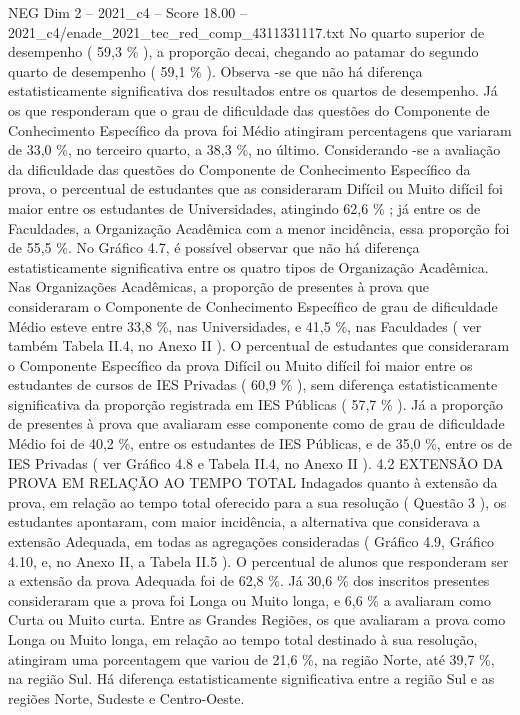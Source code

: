 \begin{textsample}{NEG Dim 2 – 2021\_c4 – Score 18.00 – 2021\_c4/enade\_2021\_tec\_red\_comp\_4311331117.txt}
No quarto superior de desempenho ( 59,3 \% ), a proporção decai, chegando ao patamar do segundo quarto de desempenho ( 59,1 \% ).
Observa -se que não há diferença estatisticamente significativa dos resultados entre os quartos de desempenho.
Já os que responderam que o grau de dificuldade das questões do Componente de Conhecimento Específico da prova foi Médio atingiram percentagens que variaram de 33,0 \%, no terceiro quarto, a 38,3 \%, no último.
Considerando -se a avaliação da dificuldade das questões do Componente de Conhecimento Específico da prova, o percentual de estudantes que as consideraram Difícil ou Muito difícil foi maior entre os estudantes de Universidades, atingindo 62,6 \% ; já entre os de Faculdades, a Organização Acadêmica com a menor incidência, essa proporção foi de 55,5 \%.
No Gráfico 4.7, é possível observar que não há diferença estatisticamente significativa entre os quatro tipos de Organização Acadêmica.
Nas Organizações Acadêmicas, a proporção de presentes à prova que consideraram o Componente de Conhecimento Específico de grau de dificuldade Médio esteve entre 33,8 \%, nas Universidades, e 41,5 \%, nas Faculdades ( ver também Tabela II.4, no Anexo II ).
O percentual de estudantes que consideraram o Componente Específico da prova Difícil ou Muito difícil foi maior entre os estudantes de cursos de IES Privadas ( 60,9 \% ), sem diferença estatisticamente significativa da proporção registrada em IES Públicas ( 57,7 \% ).
Já a proporção de presentes à prova que avaliaram esse componente como de grau de dificuldade Médio foi de 40,2 \%, entre os estudantes de IES Públicas, e de 35,0 \%, entre os de IES Privadas ( ver Gráfico 4.8 e Tabela II.4, no Anexo II ). 4.2 EXTENSÃO DA PROVA EM RELAÇÃO AO TEMPO TOTAL Indagados quanto à extensão da prova, em relação ao tempo total oferecido para a sua resolução ( Questão 3 ), os estudantes apontaram, com maior incidência, a alternativa que considerava a extensão Adequada, em todas as agregações consideradas ( Gráfico 4.9, Gráfico 4.10, e, no Anexo II, a Tabela II.5 ).
O percentual de alunos que responderam ser a extensão da prova Adequada foi de 62,8 \%.
Já 30,6 \% dos inscritos presentes consideraram que a prova foi Longa ou Muito longa, e 6,6 \% a avaliaram como Curta ou Muito curta.
Entre as Grandes Regiões, os que avaliaram a prova como Longa ou Muito longa, em relação ao tempo total destinado à sua resolução, atingiram uma porcentagem que variou de 21,6 \%, na região Norte, até 39,7 \%, na região Sul.
Há diferença estatisticamente significativa entre a região Sul e as regiões Norte, Sudeste e Centro-Oeste.

\end{textsample}

